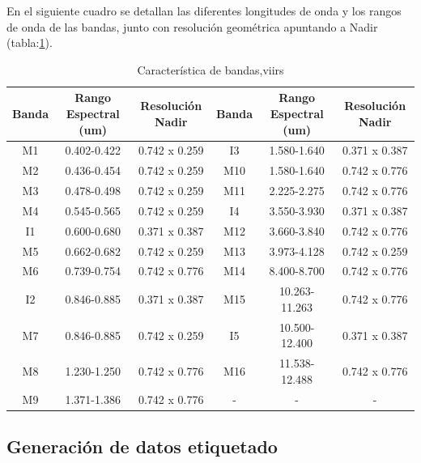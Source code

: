 En el siguiente cuadro se detallan las diferentes longitudes de onda y los rangos de onda de las bandas, junto con resolución geométrica apuntando a Nadir (tabla:\ref{tab:viirs}).
\begin{table}[H]
\begin{center}
\begin{tabular}{|c|c|c||c|c|c|}
\hline \textbf{Banda} & Rango Espectral (um) & Resolución Nadir & \textbf{Banda} & Rango Espectral (um) & Resolución Nadir \\\hline 
 		M1  & 0.402-0.422   & 0.742 x 0.259 & I3  & 1.580-1.640   & 0.371 x 0.387 \\ \hline 
		M2  & 0.436-0.454   & 0.742 x 0.259 & M10 & 1.580-1.640   & 0.742 x 0.776 \\ \hline 
		M3  & 0.478-0.498   & 0.742 x 0.259 & M11 & 2.225-2.275   & 0.742 x 0.776 \\ \hline 
		M4  & 0.545-0.565   & 0.742 x 0.259 & I4  & 3.550-3.930   & 0.371 x 0.387 \\ \hline 
		I1  & 0.600-0.680   & 0.371 x 0.387 & M12 & 3.660-3.840   & 0.742 x 0.776 \\ \hline 
		M5  & 0.662-0.682   & 0.742 x 0.259 & M13 & 3.973-4.128   & 0.742 x 0.259 \\ \hline 
		M6  & 0.739-0.754   & 0.742 x 0.776 & M14 & 8.400-8.700   & 0.742 x 0.776 \\ \hline 
		I2  & 0.846-0.885   & 0.371 x 0.387 & M15 & 10.263-11.263 & 0.742 x 0.776 \\ \hline 
		M7  & 0.846-0.885   & 0.742 x 0.259 & I5  & 10.500-12.400 & 0.371 x 0.387 \\ \hline 
		M8  & 1.230-1.250   & 0.742 x 0.776 & M16 & 11.538-12.488 & 0.742 x 0.776 \\ \hline 
		M9  & 1.371-1.386   & 0.742 x 0.776 & - &-&- \\ \hline 
\end{tabular}
\end{center}\caption{Característica de bandas,\ac{viirs} \label{tab:viirs}}
\end{table}

\subsection{Generación de datos etiquetado}\label{sub:generacion_datos_etiquetado}


